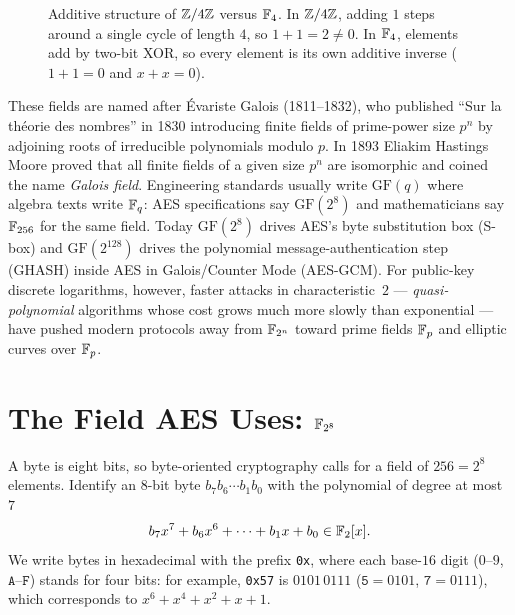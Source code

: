 \begin{figure}[htbp]
\caption{Additive structure of $\mathbb{Z}/4\mathbb{Z}$ versus $\mathbb{F}_4$. In $\mathbb{Z}/4\mathbb{Z}$, adding $1$ steps around a single cycle of length $4$, so $1+1 = 2 \neq 0$. In $\mathbb{F}_4$, elements add by two-bit XOR, so every element is its own additive inverse ($1+1 = 0$ and $x+x = 0$).}
\label{ch06:fig-f4-vs-z4}
\end{figure}

\begin{historybox}
These fields are named after \'Evariste Galois (1811--1832), who published ``Sur la th\'eorie des nombres'' in 1830 introducing finite fields of prime-power size $p^n$ by adjoining roots of irreducible polynomials modulo $p$. In 1893 Eliakim Hastings Moore proved that all finite fields of a given size $p^n$ are isomorphic and coined the name \emph{Galois field}. Engineering standards usually write $\mathrm{GF}(q)$ where algebra texts write $\mathbb{F}_q$: AES specifications say $\mathrm{GF}(2^8)$ and mathematicians say $\mathbb{F}_{256}$ for the same field. Today $\mathrm{GF}(2^8)$ drives AES's byte substitution box (S-box) and $\mathrm{GF}(2^{128})$ drives the polynomial message-authentication step (GHASH) inside AES in Galois/Counter Mode (AES-GCM). For public-key discrete logarithms, however, faster attacks in characteristic~$2$ --- \emph{quasi-polynomial} algorithms whose cost grows much more slowly than exponential --- have pushed modern protocols away from $\mathbb{F}_{2^n}$ toward prime fields $\mathbb{F}_p$ and elliptic curves over $\mathbb{F}_p$.
\end{historybox}

\section{The Field AES Uses: $\mathbb{F}_{2^8}$}
\label{ch06:f256}

A byte is eight bits, so byte-oriented cryptography calls for a field of
$256 = 2^8$ elements. Identify an $8$-bit byte $b_7 b_6 \cdots b_1 b_0$ with
the polynomial of degree at most $7$
\[
b_7 x^7 + b_6 x^6 + \cdots + b_1 x + b_0 \in \mathbb{F}_2[x].
\]
We write bytes in hexadecimal with the prefix \texttt{0x}, where each base-$16$
digit ($0$--$9$, $\texttt{A}$--$\texttt{F}$) stands for four bits: for example,
\texttt{0x57} is $0101\,0111$ ($\texttt{5} = 0101$, $\texttt{7} = 0111$), which
corresponds to $x^6 + x^4 + x^2 + x + 1$.

